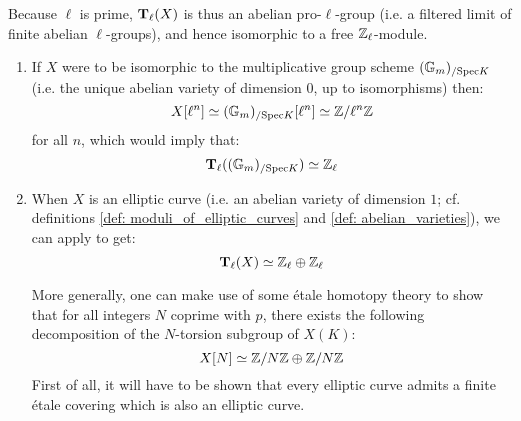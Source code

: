 \begin{example}
\begin{enumerate}
\begin{itemize}
                            Because $\ell$ is prime, $\mathbf{T}_{\ell}(X)$ is thus an abelian pro-$\ell$-group (i.e. a filtered limit of finite abelian $\ell$-groups), and hence isomorphic to a free $\mathbb{Z}_{\ell}$-module. 
                                \begin{enumerate}
                                    \item If $X$ were to be isomorphic to the multiplicative group scheme $(\mathbb{G}_m)_{/\mathrm{Spec} K}$ (i.e. the unique abelian variety of dimension $0$, up to isomorphisms) then:
                                        $$X[\ell^n] \simeq (\mathbb{G}_m)_{/\mathrm{Spec} K}[\ell^n] \simeq \mathbb{Z}/\ell^n\mathbb{Z}$$
                                    for all $n$, which would imply that:
                                        $$\mathbf{T}_{\ell}( (\mathbb{G}_m)_{/\mathrm{Spec} K} ) \simeq \mathbb{Z}_{\ell}$$
                                    \item When $X$ is an elliptic curve (i.e. an abelian variety of dimension $1$; cf. definitions \ref{def: moduli_of_elliptic_curves} and \ref{def: abelian_varieties}), we can apply \cite[Corollary 6.4]{silverman_elliptic_curves} to get:
                                        $$\mathbf{T}_{\ell}(X) \simeq \mathbb{Z}_{\ell} \oplus \mathbb{Z}_{\ell}$$
                                    
                                    More generally, one can make use of some \'etale homotopy theory to show that for all integers $N$ coprime with $p$, there exists the following decomposition of the $N$-torsion subgroup of $X(K)$:
                                        $$X[N] \simeq \mathbb{Z}/N\mathbb{Z} \oplus \mathbb{Z}/N\mathbb{Z}$$
                                    First of all, it will have to be shown that every elliptic curve admits a finite \'etale covering which is also an elliptic curve. 
                                \end{enumerate}
                        \end{itemize}
                \end{enumerate}
            \end{example}
        
